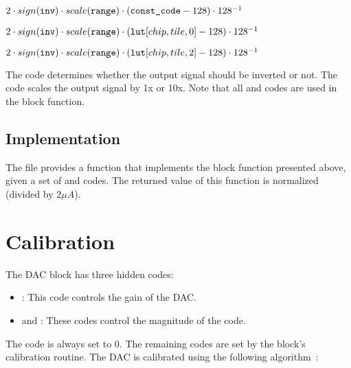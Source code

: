 \begin{algorithmic}

    \State $2 \cdot sign(\tx{inv}) \cdot scale(\tx{range}) \cdot (\tx{const_code}-128)\cdot 128^{-1}$

    \State $2 \cdot sign(\tx{inv}) \cdot scale(\tx{range}) \cdot (\tx{lut}\hslice{chip}{tile}{0}-128)\cdot 128^{-1}$

    \State $2 \cdot sign(\tx{inv}) \cdot scale(\tx{range}) \cdot (\tx{lut}\hslice{chip}{tile}{2}-128)\cdot 128^{-1}$
    \EndIf
 \EndIf
\end{algorithmic}

The  code determines whether the output signal should be inverted or
not. The  code scales the output signal by 1x or 10x. Note
that all \static and \dynamic codes are used in the block function.

\subsection{\analoglib Implementation}
The  file provides a  function that implements the
block function presented above, given a set of \dynamic and \static codes. The
returned value of this function is normalized (divided by $2 \mu A$).

\section{Calibration}
The DAC block has three hidden codes:
\begin{itemize}
\item{}: This code controls the gain of the DAC.
\item{} and : These codes control the magnitude of the
   code.
\end{itemize}
The  code is always set to $0$. The remaining codes are set by the block's
calibration routine. The DAC is calibrated using the following
algorithm~\cite{dac_calib.cpp}:

\begin{algorithmic}
    \EndFor
  \EndFor

  \EndFor
\end{algorithmic}

